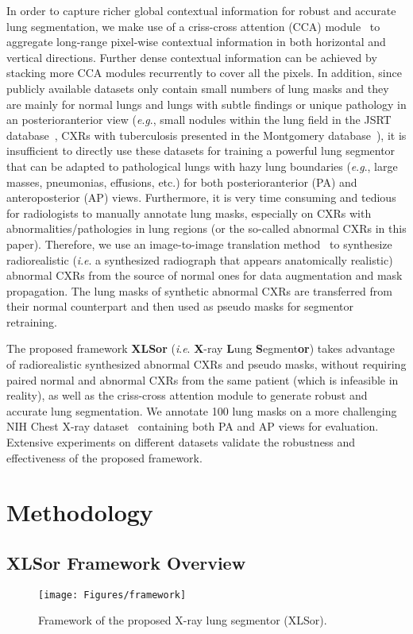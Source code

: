 \documentclass{midl} \usepackage{multirow}
\newcommand{\ie}{\textit{i}.\textit{e}. }
\newcommand{\eg}{\textit{e}.\textit{g}., }
\begin{document}
In order to capture richer global contextual information for robust and accurate lung segmentation, we make use of a criss-cross attention (CCA) module~\cite{Huang2018CCNetCA} to aggregate long-range pixel-wise contextual information in both horizontal and vertical directions. Further dense contextual information can be achieved by stacking more CCA modules recurrently to cover all the pixels. In addition, since publicly available datasets only contain small numbers of lung masks and they are mainly for normal lungs and lungs with subtle findings or unique pathology in an posterioranterior view (\eg small nodules within the lung field in the JSRT database~\cite{JSRT}, CXRs with tuberculosis presented in the Montgomery database~\cite{TB_data}), it is insufficient to directly use these datasets for training a powerful lung segmentor that can be adapted to pathological lungs with hazy lung boundaries (\eg  large masses, pneumonias, effusions, etc.) for both posterioranterior (PA) and anteroposterior (AP) views. Furthermore, it is very time consuming and tedious for radiologists to manually annotate lung masks, especially on CXRs with abnormalities/pathologies in lung regions (or the so-called abnormal CXRs in this paper). Therefore, we use an image-to-image translation method~\cite{munit} to synthesize radiorealistic (\ie a synthesized radiograph that appears anatomically realistic) abnormal CXRs from the source of normal ones for data augmentation and mask propagation. The lung masks of synthetic abnormal CXRs are transferred from their normal counterpart and then used as pseudo masks for segmentor retraining.

The proposed framework \textbf{XLSor} (\ie \textbf{X}-ray \textbf{L}ung \textbf{S}egment\textbf{or}) takes advantage of radiorealistic synthesized abnormal CXRs and pseudo masks, without requiring paired normal and abnormal CXRs from the same patient (which is infeasible in reality), as well as the criss-cross attention module to generate robust and accurate lung segmentation. We annotate 100 lung masks on a more challenging NIH Chest X-ray dataset~\cite{Wang_cvpr17} containing both PA and AP views for evaluation. Extensive experiments on different datasets validate the robustness and effectiveness of the proposed framework.

\section{Methodology}

\subsection{XLSor Framework Overview}
\label{xlsor}
\begin{figure*}[t!]
  \centering
  \texttt{[image: Figures/framework]}
  \caption{Framework  of the proposed X-ray lung segmentor (XLSor).}
  \label{fig:fw}
\end{figure*}
\end{document}
